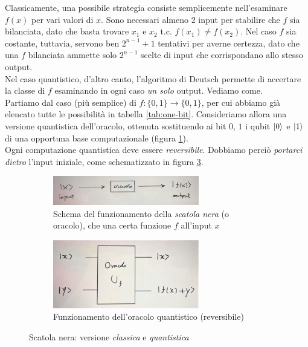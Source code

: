 \documentclass[../../InformazioneQuantistica.tex]{subfiles}
\begin{document}
Classicamente, una possibile strategia consiste semplicemente nell'esaminare $f(x)$ per vari valori di $x$. Sono necessari almeno $2$ input per stabilire che $f$ sia bilanciata, dato che basta trovare $x_1$ e $x_2$ t.c. $f(x_1) \neq f(x_2)$. Nel caso $f$ sia costante, tuttavia, servono ben $2^{n-1}+1$ tentativi per averne certezza, dato che una $f$ bilanciata ammette solo $2^{n-1}$ scelte di input che corrispondano allo stesso output.\\
Nel caso quantistico, d'altro canto, l'algoritmo di Deutsch permette di accertare la classe di $f$ esaminando in ogni caso \textit{un solo} output. Vediamo come.\\

Partiamo dal caso (più semplice) di $f: \{0,1\} \to \{0,1\}$, per cui abbiamo già elencato tutte le possibilità in tabella \ref{tab:one-bit}. Consideriamo allora una versione quantistica dell'oracolo, ottenuta sostituendo ai bit $0$, $1$ i qubit $\Ket{0}$ e $\Ket{1}$ di una opportuna base computazionale (figura \ref{fig:scatola-nera}).\\
Ogni computazione quantistica deve essere \textit{reversibile}. Dobbiamo perciò \textit{portarci dietro} l'input iniziale, come schematizzato in figura \ref{fig:oracolo-quant}.

\begin{figure}[H]
\centering
    \begin{subfigure}[t]{0.45\textwidth}
        \centering
        \includegraphics[width=0.7\textwidth]{Immagini/17_4/1.jpg}
        \caption{\footnotesize Schema del funzionamento della \textit{scatola nera} (o oracolo), che  una certa funzione $f$ all'input $x$\label{fig:scatola-nera}}
    \end{subfigure}%
    \begin{subfigure}[t]{0.45\textwidth}
        \centering
        \includegraphics[width=0.7\textwidth]{Immagini/17_4/2.jpg}
        \caption{\footnotesize Funzionamento dell'oracolo quantistico (reversibile)\label{fig:oracolo-quant}}
    \end{subfigure}
\caption{Scatola nera: versione \textit{classica} e \textit{quantistica}}
\end{figure}
\end{document}
